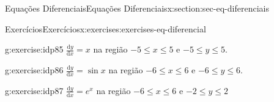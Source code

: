 \documentclass[oneside,10pt,]{article}
\numberwithin{equation}{section}
\newcommand{\dd}{\mathrm{d}}
\begin{document}
\begin{sectionptx}{Equações Diferenciais}{}{Equações Diferenciais}{}{}{x:section:sec-eq-diferenciais}
\begin{exercises-subsection}{Exercícios}{}{Exercícios}{}{}{x:exercises:exercises-eq-diferencial}
\begin{exercisegroup}
\begin{divisionexerciseeg}{11}{}{}{g:exercise:idp85}%
\(\frac{\dd y}{\dd x} = x\) na região \(−5 \leq x \leq 5\) e \(−5 \leq y \leq 5.\)%
\end{divisionexerciseeg}%
\begin{divisionexerciseeg}{12}{}{}{g:exercise:idp86}%
\(\frac{\dd y}{\dd x} = \sin{x}\) na região \(−6 \leq x \leq 6\) e \(−6 \leq y \leq 6.\)%
\end{divisionexerciseeg}%
\begin{divisionexerciseeg}{13}{}{}{g:exercise:idp87}%
\(\frac{\dd y}{\dd x} = e^x\) na região \(−6 \leq x \leq 6\) e \(−2 \leq y \leq 2\)%
\end{divisionexerciseeg}%
\end{exercisegroup}
\par\medskip\noindent
\end{exercises-subsection}
\end{sectionptx}
\end{document}
